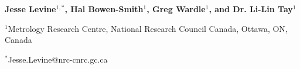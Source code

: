 \documentclass[final]{article}
\newcommand{\bodytext}{\fontsize{18.0}{21.6}\selectfont}
\begin{document}
\bodytext\color{textblack}

\noindent
\colorbox{pagecream}{%
  \begin{minipage}[t][1.75in][c]{0.602\linewidth}
  \end{minipage}%
}%
\hfill
\colorbox{templatedark}{%
  \begin{minipage}[t][1.75in][c]{0.340\linewidth}
  \raggedleft\color{white}
  {\fontsize{25}{29}\selectfont\bfseries Jesse Levine$^{1,*}$, Hal Bowen-Smith$^{1}$, Greg Wardle$^{1}$, and Dr. Li-Lin Tay$^{1}$}\par
  \vspace{0.07in}
  {\fontsize{18}{21}\selectfont $^{1}$Metrology Research Centre, National Research Council Canada, Ottawa, ON, Canada}\par
  \vspace{0.06in}
  {\fontsize{15.5}{18}\selectfont $^{*}$Jesse.Levine@nrc-cnrc.gc.ca}
  \end{minipage}%
}

\vspace{0.14in}
\end{document}
